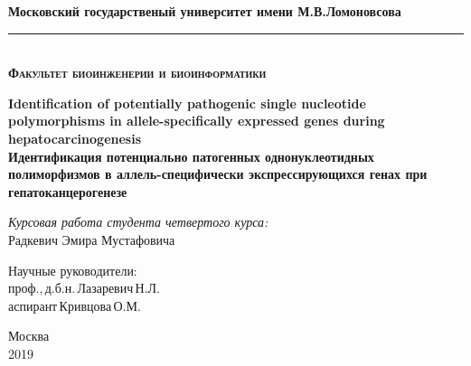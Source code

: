 \begin{titlepage}

\newcommand{\HRule}{\rule{\linewidth}{0.3mm}} %

\center

\textbf{Московский государственый университет имени М.В.Ломоновсова}
\\[0.3cm] 
\HRule 
\\[0.3cm]
\textbf{\textsc{\large Факультет биоинженерии и биоинформатики}}
\\[3.0cm]

\begin{spacing}{1.4}
{\LARGE \textbf{Identification of potentially pathogenic single nucleotide polymorphisms in allele-specifically expressed genes during hepatocarcinogenesis}} \\[1.0cm]


{\LARGE \textbf{Идентификация потенциально патогенных однонуклеотидных полиморфизмов в аллель-специфически экспрессирующихся генах при гепатоканцерогенезе}} \\[3.0cm]
\end{spacing}
 
 
\Large \textit{Курсовая работа студента четвертого курса:}\\
Радкевич Эмира Мустафовича
\\[1.5cm]


\begin{flushright} \large
Научные руководители: \\
проф.,\,д.б.н.\,Лазаревич\,Н.Л. \\
аспирант\,Кривцова\,О.М.
\\[1.5cm]
\end{flushright}


{\large Москва \\ 2019}


\end{titlepage}